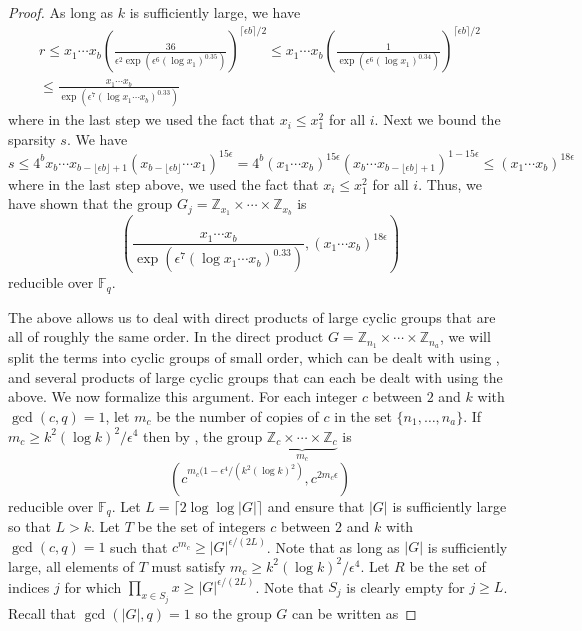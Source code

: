 \documentclass{toc}
\newcommand\F{{\mathbb{F}}}
\renewcommand\Z{{\mathbb{Z}}}
\begin{document}
\begin{proof}
As long as $k$ is sufficiently large, we have
%
\begin{eqnarray*}
r \leq x_1 \cdots x_b\left( \frac{36}{\epsilon^2 \exp\left(\epsilon^6 (\log x_1)^{0.35}\right)} \right)^{\lceil \epsilon b \rceil/2} \leq x_1 \cdots x_b\left( \frac{1}{\exp\left(\epsilon^6 (\log x_1)^{0.34}\right)} \right)^{\lceil \epsilon b \rceil/2}  \\ \leq \frac{ x_1 \cdots x_b}{\exp\left(\epsilon^7 (\log x_1 \cdots x_b )^{0.33}\right)}
\end{eqnarray*}
where in the last step we used the fact that $x_i \leq x_1^2$ for all $i$.  Next we bound the sparsity $s$.  We have
\[
s \leq 4^b x_b \cdots x_{b - \lfloor \epsilon b\rfloor + 1}(x_{b - \lfloor \epsilon b\rfloor} \cdots x_1)^{15\epsilon} = 4^b (x_1 \cdots x_b)^{15\epsilon}(x_b \cdots x_{b - \lfloor \epsilon b\rfloor + 1})^{1 - 15\epsilon} \leq (x_1 \cdots x_b)^{18\epsilon}
\]
where in the last step above, we used the fact that $x_i \leq x_1^2$ for all $i$.  Thus, we have shown that the group $G_j = \Z_{x_1} \times \cdots \times \Z_{x_b}$ is 
\[
\left( \frac{ x_1 \cdots x_b}{\exp\left(\epsilon^7 (\log x_1 \cdots x_b )^{0.33}\right)}, (x_1 \cdots x_b)^{18\epsilon}\right)
\]
reducible over $\F_q$.

The above allows us to deal with direct products of large cyclic groups that are all of roughly the same order.  In the direct product $G = \Z_{n_1} \times \cdots \times \Z_{n_a}$, we will split the terms into cyclic groups of small order, which can be dealt with using , and several products of large cyclic groups that can each be dealt with using the above. We now formalize this argument.  For each integer $c$ between $2$ and $k$ with $\gcd(c,q) = 1$, let $m_c$ be the number of copies of $c$ in the set $\{n_1, \dots , n_a \}$.  If $m_c \geq k^2 (\log k)^2/\epsilon^4 $ then by , the group $\underbrace{\Z_c \times \cdots \times \Z_c}_{m_c}$ is 
\[
\left( c^{m_c(1 - \epsilon^4/(k^2 (\log k)^2)}, c^{2m_c \epsilon} \right)
\]
reducible over $\F_q$.  Let $L = \lceil 2\log \log |G| \rceil$ and ensure that $|G|$ is sufficiently large so that $L > k$.  Let $T$ be the set of integers $c$ between $2$ and $k$ with $\gcd(c,q) = 1$ such that $c^{m_c} \geq |G|^{\epsilon/(2L)}$.  Note that as long as $|G|$ is sufficiently large, all elements of $T$ must satisfy $m_c \geq k^2 (\log k)^2/\epsilon^4 $.  Let $R$ be the set of indices $j$ for which $\prod_{x \in S_j}x \geq |G|^{\epsilon/(2L)}$.  Note that $S_j$ is clearly empty for $j \geq L$.  Recall that $\gcd(|G|,q) = 1$ so the group $G$ can be written as 


\end{proof}
\end{document}
